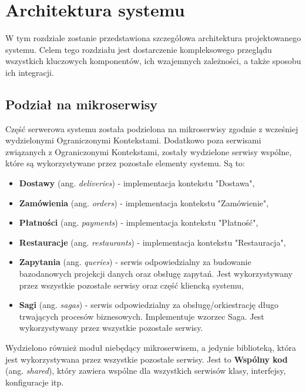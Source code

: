\clearpage %

\section{Architektura systemu}

W tym rozdziale zostanie przedstawiona szczegółowa architektura projektowanego systemu. Celem tego rozdziału jest dostarczenie kompleksowego przeglądu wszystkich kluczowych komponentów, ich wzajemnych zależności, a także sposobu ich integracji.

\subsection{Podział na mikroserwisy}

Część serwerowa systemu została podzielona na mikroserwisy zgodnie z wcześniej wydzielonymi Ograniczonymi Kontekstami. Dodatkowo poza serwisami związanych z Ograniczonymi Kontekstami, zostały wydzielone serwisy wspólne, które są wykorzystywane przez pozostałe elementy systemu. Są to:

\begin{itemize}

    \item \textbf{Dostawy} (ang. \textit{deliveries}) - implementacja kontekstu "Dostawa",
    \item \textbf{Zamówienia} (ang. \textit{orders}) - implementacja kontekstu "Zamówienie",
    \item \textbf{Płatności} (ang. \textit{payments}) - implementacja kontekstu "Płatność",
    \item \textbf{Restauracje} (ang. \textit{restaurants}) - implementacja kontekstu "Restauracja",
    \item \textbf{Zapytania} (ang. \textit{queries}) - serwis odpowiedzialny za budowanie bazodanowych projekcji danych oraz obsługę zapytań. Jest wykorzystywany przez wszystkie pozostałe serwisy oraz część kliencką systemu,
    \item \textbf{Sagi} (ang. \textit{sagas}) - serwis odpowiedzialny za obsługę/orkiestrację długo trwających procesów biznesowych. Implementuje wzorzec Saga. Jest wykorzystywany przez wszystkie pozostałe serwisy.

\end{itemize}

Wydzielono również moduł niebędący mikroserwisem, a jedynie biblioteką, która jest wykorzystywana przez wszystkie pozostałe serwisy. Jest to \textbf{Wspólny kod} (ang. \textit{shared}), który zawiera wspólne dla wszystkich serwisów klasy, interfejsy, konfiguracje itp.

